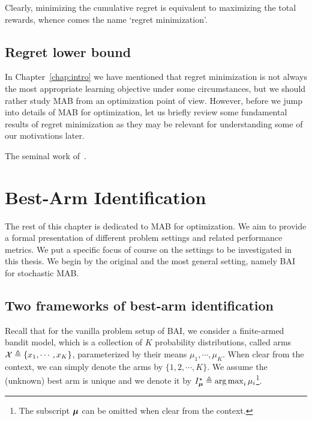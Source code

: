 Clearly, minimizing the cumulative regret is equivalent to maximizing the total rewards, whence comes the name `regret minimization'. 

\subsection{Regret lower bound}

In Chapter~\ref{chap:intro} we have mentioned that regret minimization is not always the most appropriate learning objective under some circumstances, but we should rather study MAB from an optimization point of view. However, before we jump into details of MAB for optimization, let us briefly review some fundamental results of regret minimization as they may be relevant for understanding some of our motivations later.

The seminal work of~\cite{robbins1952}.

\section{Best-Arm Identification}\label{sec:mab.bai}

The rest of this chapter is dedicated to MAB for optimization. We aim to provide a formal presentation of different problem settings and related performance metrics. We put a specific focus of course on the settings to be investigated in this thesis. We begin by the original and the most general setting, namely BAI for stochastic MAB.

\subsection{Two frameworks of best-arm identification}\label{sec:mab.bai.frameworks}

Recall that for the vanilla problem setup of BAI, we consider a finite-armed bandit model, which is a collection of $K$ probability distributions, called arms $\mathcal{X}\triangleq\{x_1,\cdots,x_K\}$, parameterized by their means $\mu_1, \cdots, \mu_K$. When clear from the context, we can simply denote the arms by $\{1,2,\cdots,K\}$. We assume the (unknown) best arm is unique and we denote it by $I_{{\boldsymbol \mu}}^\star \triangleq \operatorname*{arg\,max}_i \mu_i$\footnote{The subscript ${\boldsymbol \mu}$ can be omitted when clear from the context.}. 

